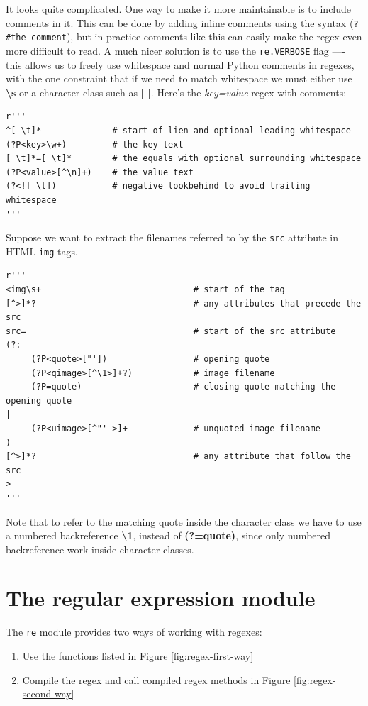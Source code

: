 It looks quite complicated.
One way to make it more maintainable is to include comments in it.
This can be done by adding inline comments using the syntax (\verb|?#the comment|), but in practice comments like this can easily make the regex even more difficult to read.
A much nicer solution is to use the \verb|re.VERBOSE| flag —- this allows us to freely use whitespace and normal Python comments in regexes, with the one constraint that if we need to match whitespace we must either use \textbf{\textbackslash s} or a character class such as \textbf{[ ]}.
Here’s the \textit{key=value} regex with comments:
\begin{lstlisting}
r'''
^[ \t]*              # start of lien and optional leading whitespace
(?P<key>\w+)         # the key text
[ \t]*=[ \t]*        # the equals with optional surrounding whitespace
(?P<value>[^\n]+)    # the value text
(?<![ \t])           # negative lookbehind to avoid trailing whitespace
'''
\end{lstlisting}




Suppose we want to extract the filenames referred to by the \verb|src| attribute in HTML \verb|img| tags.
\begin{lstlisting}
r'''
<img\s+                              # start of the tag
[^>]*?                               # any attributes that precede the src
src=                                 # start of the src attribute
(?:
     (?P<quote>["'])                 # opening quote
     (?P<qimage>[^\1>]+?)            # image filename
     (?P=quote)                      # closing quote matching the opening quote
|
     (?P<uimage>[^"' >]+             # unquoted image filename
)
[^>]*?                               # any attribute that follow the src
>     
'''
\end{lstlisting}

Note that to refer to the matching quote inside the character class we have to use a numbered backreference \textbf{\textbackslash 1}, instead of \textbf{(?=quote)}, since only numbered backreference work inside character classes.


\section{The regular expression module}

The \verb|re| module provides two ways of working with regexes:
\begin{enumerate}
\item Use the functions listed in Figure \ref{fig:regex-first-way}
\item Compile the regex and call compiled regex methods in Figure \ref{fig:regex-second-way}
\end{enumerate}

